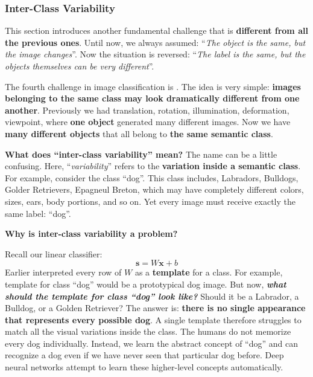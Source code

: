 \subsubsection{Inter-Class Variability}\label{sec:inter-class-variability}

This section introduces another fundamental challenge that is \textbf{different from all the previous ones}. Until now, we always assumed: ``\emph{The object is the same, but the image changes}''. Now the situation is reversed: ``\emph{The label is the same, but the objects themselves can be very different}''.

\highspace
The fourth challenge in image classification is . The idea is very simple: \textbf{images belonging to the same class may look dramatically different from one another}. Previously we had translation, rotation, illumination, deformation, viewpoint, where \textbf{one object} generated many different images. Now we have \textbf{many different objects} that all belong to \textbf{the same semantic class}.

\highspace
\textcolor{Green3}{ \textbf{What does ``inter-class variability'' mean?}} The name can be a little confusing. Here, ``\emph{variability}'' refers to the \textbf{variation inside a semantic class}. For example, consider the class ``dog''. This class includes, Labradors, Bulldogs, Golder Retrievers, Epagneul Breton, which may have completely different colors, sizes, ears, body portions, and so on. Yet every image must receive exactly the same label: ``dog''.

\highspace
\begin{flushleft}
    \textcolor{Red2}{ \textbf{Why is inter-class variability a problem?}}
\end{flushleft}
Recall our linear classifier:
\begin{equation*}
    \mathbf{s} = W\mathbf{x} + b
\end{equation*}
Earlier  interpreted every row of $W$ as a \textbf{template} for a class. For example, template for class ``dog'' would be a prototypical dog image. But now, \textbf{\emph{what should the template for class ``dog'' look like?}} Should it be a Labrador, a Bulldog, or a Golden Retriever? The answer is: \textbf{there is no single appearance that represents every possible dog}. A single template therefore struggles to match all the visual variations inside the class. The humans do not memorize every dog individually. Instead, we learn the abstract concept of ``dog'' and can recognize a dog even if we have never seen that particular dog before. Deep neural networks attempt to learn these higher-level concepts automatically.

